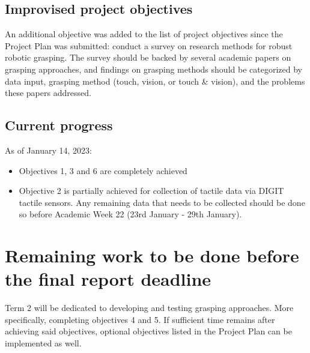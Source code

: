 \documentclass{article}
\begin{document}
\subsection{Improvised project objectives}
An additional objective was added to the list of project objectives since the Project Plan was submitted: conduct a survey on research methods for robust robotic grasping. The survey should be backed by several academic papers on grasping approaches, and findings on grasping methods should be categorized by data input, grasping method (touch, vision, or touch \& vision), and the problems these papers addressed.

\subsection{Current progress}
As of January 14, 2023:
\begin{itemize}
    \item Objectives 1, 3 and 6 are completely achieved
    \item Objective 2 is partially achieved for collection of tactile data via DIGIT tactile sensors. Any remaining data that needs to be collected should be done so before Academic Week 22 (23rd January - 29th January).
\end{itemize}

\section{Remaining work to be done before the final report deadline}
Term 2 will be dedicated to developing and testing grasping approaches. More specifically, completing objectives 4 and 5. If sufficient time remains after achieving said objectives, optional objectives listed in the Project Plan can be implemented as well.
\end{document}
